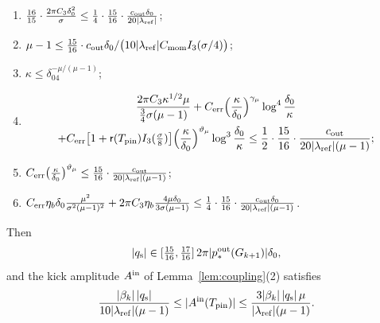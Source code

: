 \begin{lemma}
\begin{itemize}
\begin{enumerate}[label=\textup{(\alph*)}]
\item $\frac{16}{15}\cdot\frac{2\pi C_3\delta_0^2}{\sigma}\le\frac14\cdot\frac{15}{16}\cdot\frac{c_{\mathrm{out}}\delta_0}{20|\lambda_{\mathrm{ref}}|}$;
\item $\mu-1\le\frac{15}{16}\cdot c_{\mathrm{out}}\delta_0/\big(10|\lambda_{\mathrm{ref}}|C_{\mathrm{mom}}I_{3}(\sigma/4)\big)$;
\item $\kappa\le\delta_04^{-\mu/(\mu-1)}$;
\item \begin{multline*}
  \frac{2\pi C_3\kappa^{1/2}\mu}{\frac34\sigma(\mu-1)}+C_{\mathrm{err}}\Big(\frac\kappa{\delta_0}\Big)^{\gamma_\mu}\log^4\frac{\delta_0}\kappa\\
  +C_{\mathrm{err}}\big[1+\mathsf{r}(T_{\mathrm{pin}})I_{3}(\tfrac\sigma8)\big]\Big(\frac\kappa{\delta_0}\Big)^{\vartheta_\mu}\log^3\frac{\delta_0}\kappa
  \le\frac12\cdot\frac{15}{16}\cdot\frac{c_{\mathrm{out}}}{20|\lambda_{\mathrm{ref}}|(\mu-1)};
  \end{multline*}
\item $C_{\mathrm{err}}\big(\frac\kappa{\delta_0}\big)^{\vartheta_\mu}\le\frac{15}{16}\cdot\frac{c_{\mathrm{out}}}{20|\lambda_{\mathrm{ref}}|(\mu-1)}$;
\item $C_{\mathrm{err}}\eta_b\delta_0\frac{\mu^2}{\sigma^2(\mu-1)^2}+2\pi C_3\eta_b\frac{4\mu\delta_0}{3\sigma(\mu-1)}
  \le\frac14\cdot\frac{15}{16}\cdot\frac{c_{\mathrm{out}}\delta_0}{20|\lambda_{\mathrm{ref}}|(\mu-1)}$.
\end{enumerate}
\end{itemize}
Then
\begin{equation}
\label{eq:kicktrue-moment-size}
|q_{\mathrm{s}}|\in[\tfrac{15}{16},\tfrac{17}{16}]\,2\pi|p^{\mathrm{out}}_*(G_{k+1})|\delta_0,
\end{equation}
and the
kick amplitude $A^{\mathrm{in}}$ of Lemma~\ref{lem:coupling}\textup{(2)} satisfies
\begin{equation}
\label{eq:kicktrue-amplitude}
\frac{|\beta_k|\,|q_{\mathrm{s}}|}{10|\lambda_{\mathrm{ref}}|(\mu-1)}\le|A^{\mathrm{in}}(T_{\mathrm{pin}})|\le\frac{3|\beta_k|\,|q_{\mathrm{s}}|\,\mu}{|\lambda_{\mathrm{ref}}|(\mu-1)} .
\end{equation}
\end{lemma}

